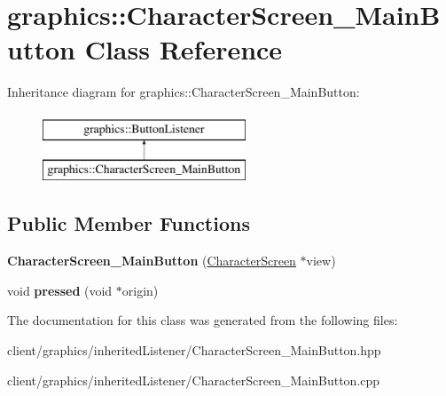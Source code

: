 \hypertarget{classgraphics_1_1_character_screen___main_button}{\section{graphics\-:\-:Character\-Screen\-\_\-\-Main\-Button Class Reference}
\label{classgraphics_1_1_character_screen___main_button}
}
Inheritance diagram for graphics\-:\-:Character\-Screen\-\_\-\-Main\-Button\-:\begin{figure}[H]
\begin{center}
\leavevmode
\includegraphics[height=2.000000cm]{classgraphics_1_1_character_screen___main_button}
\end{center}
\end{figure}
\subsection*{Public Member Functions}
\begin{DoxyCompactItemize}
\item 
\hypertarget{classgraphics_1_1_character_screen___main_button_a603ae5eb6293d9f2d9ed59b138f5fb42}{{\bfseries Character\-Screen\-\_\-\-Main\-Button} (\hyperlink{classgraphics_1_1_character_screen}{Character\-Screen} $\ast$view)}\label{classgraphics_1_1_character_screen___main_button_a603ae5eb6293d9f2d9ed59b138f5fb42}

\item 
\hypertarget{classgraphics_1_1_character_screen___main_button_a6090aac869b161eb038245ac77fe93b3}{void {\bfseries pressed} (void $\ast$origin)}\label{classgraphics_1_1_character_screen___main_button_a6090aac869b161eb038245ac77fe93b3}

\end{DoxyCompactItemize}


The documentation for this class was generated from the following files\-:\begin{DoxyCompactItemize}
\item 
client/graphics/inherited\-Listener/Character\-Screen\-\_\-\-Main\-Button.\-hpp\item 
client/graphics/inherited\-Listener/Character\-Screen\-\_\-\-Main\-Button.\-cpp\end{DoxyCompactItemize}
